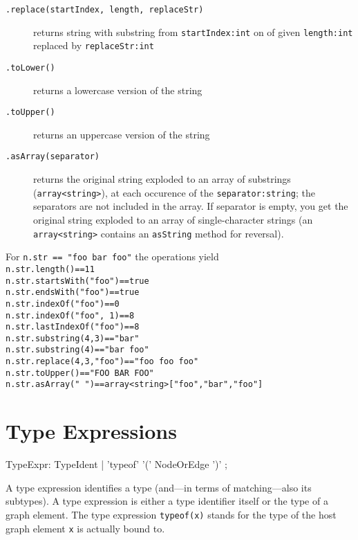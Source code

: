 \begin{description}
\item[\texttt{.replace(startIndex, length, replaceStr)}] returns string with substring from \texttt{startIndex:int} on of given \texttt{length:int} replaced by \texttt{replaceStr:int}
\item[\texttt{.toLower()}] returns a lowercase version of the string
\item[\texttt{.toUpper()}] returns an uppercase version of the string
\item[\texttt{.asArray(separator)}] returns the original string exploded to an array of substrings (\texttt{array<string>}), at each occurence of the \texttt{separator:string}; the separators are not included in the array. If separator is empty, you get the original string exploded to an array of single-character strings (an \texttt{array<string>} contains an \texttt{asString} method for reversal). 
\end{description}

\begin{example}
For \texttt{n.str == "foo bar foo"} the operations yield \\
\texttt{n.str.length()==11} \\
\texttt{n.str.startsWith("foo")==true} \\
\texttt{n.str.endsWith("foo")==true} \\
\texttt{n.str.indexOf("foo")==0} \\
\texttt{n.str.indexOf("foo", 1)==8} \\
\texttt{n.str.lastIndexOf("foo")==8} \\
\texttt{n.str.substring(4,3)=="bar"} \\
\texttt{n.str.substring(4)=="bar foo"} \\
\texttt{n.str.replace(4,3,"foo")=="foo foo foo"} \\
\texttt{n.str.toUpper()=="FOO BAR FOO"} \\
\texttt{n.str.asArray(" ")==array<string>["foo","bar","foo"]} \\
\end{example}


\section{Type Expressions}
\label{typeexpressions}

\begin{rail}
  TypeExpr: TypeIdent | 'typeof' '(' NodeOrEdge ')' ;
\end{rail}
A type expression identifies a type (and---in terms of matching---also its subtypes).
A type expression is either a type identifier itself or the type of a graph element.
The type expression \texttt{typeof(x)} stands for the type of the host graph element \texttt{x} is actually bound to.


